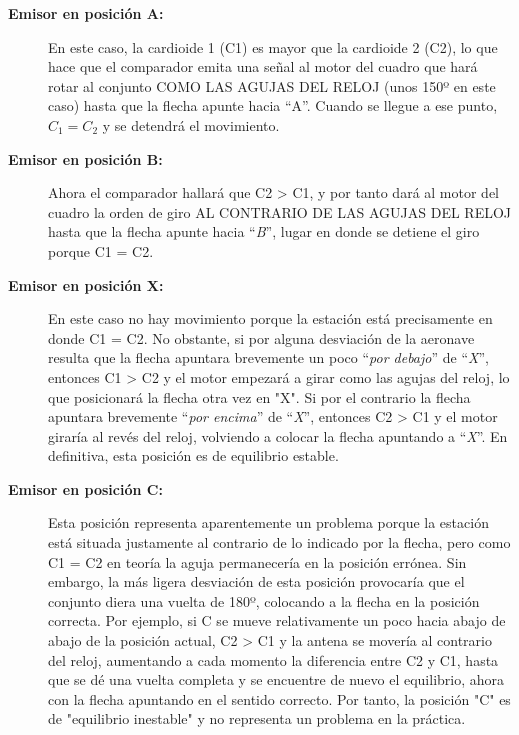 \begin{description}
\item[\bf Emisor en posici\'on A:] En este caso, la cardioide 1 (C1) es mayor que la cardioide 2 (C2), lo que hace que el comparador emita una se\~nal al motor del cuadro que har\'a rotar al conjunto COMO LAS AGUJAS DEL RELOJ (unos 150º en este caso) hasta que la flecha apunte hacia ``A''. Cuando se llegue a ese punto, $C_1=C_2$ y se detendr\'a el movimiento.


\item[\bf Emisor en posici\'on B:] Ahora el comparador hallar\'a que C2 > C1, y por tanto dar\'a al motor del cuadro la orden de giro AL CONTRARIO DE LAS AGUJAS DEL RELOJ hasta que la flecha apunte hacia ``\emph{B}'', lugar en donde se detiene el giro porque C1 = C2.
    

\item[\bf Emisor en posici\'on X:] En este caso no hay movimiento porque la estaci\'on est\'a precisamente en donde C1 = C2. No obstante, si por alguna desviaci\'on de la aeronave resulta que la flecha apuntara brevemente un poco ``\emph{por debajo}'' de ``\emph{X}'', entonces C1 > C2 y el motor empezar\'a a girar como las agujas del reloj, lo que posicionar\'a la flecha otra vez en "X". Si por el contrario la flecha apuntara brevemente ``\emph{por encima}'' de ``\emph{X}'', entonces C2 > C1 y el motor girar\'ia al rev\'es del reloj, volviendo a colocar la flecha apuntando a ``\emph{X}''. En definitiva, esta posici\'on es de equilibrio estable.


\item[\bf Emisor en posici\'on C:] Esta posici\'on representa aparentemente un problema porque la estaci\'on est\'a situada justamente al contrario de lo indicado por la flecha, pero como C1 = C2 en teor\'ia la aguja permanecer\'ia en la posici\'on err\'onea. Sin embargo, la m\'as ligera desviaci\'on de esta posici\'on provocar\'ia que el conjunto diera una vuelta de 180º, colocando a la flecha en la posici\'on correcta. Por ejemplo, si C se mueve relativamente un poco hacia abajo de abajo de la posici\'on actual, C2 > C1 y la antena se mover\'ia al contrario del reloj, aumentando a cada momento la diferencia entre C2 y C1, hasta que se d\'e una vuelta completa y se encuentre de nuevo el equilibrio, ahora con la flecha apuntando en el sentido correcto. Por tanto, la posici\'on "C" es de "equilibrio inestable" y no representa un problema en la pr\'actica.
 
\end{description}
    

